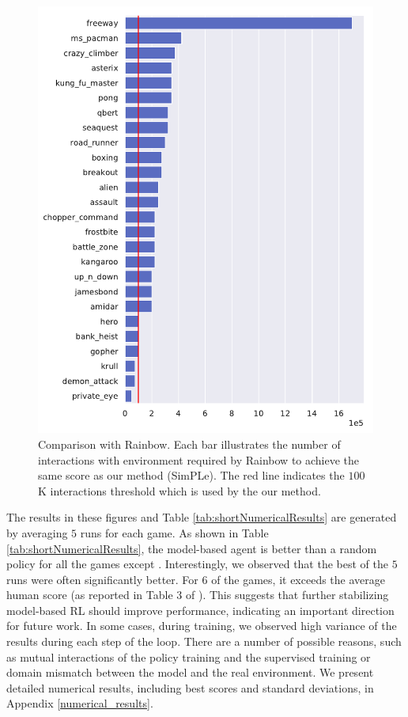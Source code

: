 \begin{figure}[t]
\centering
\includegraphics[width=1.0\columnwidth]{figures/v1_eval_longmodel_vs_rainbow-1.png}
\vspace{-0.2cm}
\caption{Comparison with Rainbow. Each bar illustrates the number of interactions with environment required by Rainbow to achieve the same score as our method (SimPLe). The red line indicates the $100$K interactions threshold which is used by the our method.} 
\label{fig:compare_dopamine}
\end{figure}

The results in these figures and Table \ref{tab:shortNumericalResults} are generated by averaging $5$ runs for each game. As shown in Table \ref{tab:shortNumericalResults}, the model-based agent is better than a random policy for all the games except \bankh. Interestingly, we observed that the best of the $5$ runs were often significantly better. For $6$ of the games, it exceeds the average human score (as reported in Table 3 of \cite{Pohlenetal2018}). This suggests that further stabilizing model-based RL should improve performance, indicating an important direction for future work. In some cases, during training, we observed high variance of the results during each step of the loop. There are a number of possible reasons, such as mutual interactions of the policy training and the supervised training or domain mismatch between the model and the real environment. We present detailed numerical results, including best scores and standard deviations, in Appendix \ref{numerical_results}.

